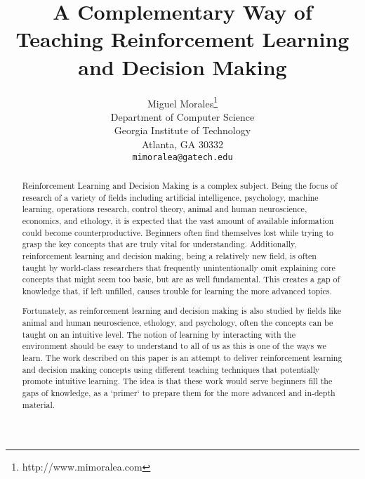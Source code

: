 \documentclass[11pt]{article} %
\title{A Complementary Way of Teaching Reinforcement Learning and Decision Making}
\author{
Miguel Morales\thanks{http://www.mimoralea.com} \\
Department of Computer Science \\
Georgia Institute of Technology \\
Atlanta, GA 30332 \\
\texttt{mimoralea@gatech.edu} \\
}
\begin{document}
\maketitle

\begin{abstract}
  Reinforcement Learning and Decision Making is a complex subject. Being the
  focus of research of a variety of fields including artificial intelligence,
  psychology, machine learning, operations research, control theory, animal
  and human neuroscience, economics, and ethology, it is expected that the
  vast amount of available information could become counterproductive.
  Beginners often find themselves lost while trying to grasp the key concepts
  that are truly vital for understanding. Additionally, reinforcement learning
  and decision making, being a relatively new field, is often taught by
  world-class researchers that frequently unintentionally omit explaining
  core concepts that might seem too basic, but are as well fundamental. This
  creates a gap of knowledge that, if left unfilled, causes trouble for learning
  the more advanced topics.

  Fortunately, as reinforcement learning and decision making is also studied
  by fields like animal and human neuroscience, ethology, and psychology, often
  the concepts can be taught on an intuitive level. The notion of learning
  by interacting with the environment should be easy to understand to all of
  us as this is one of the ways we learn. The work described on this paper
  is an attempt to deliver reinforcement learning and decision making concepts
  using different teaching techniques that potentially promote intuitive learning.
  The idea is that these work would serve beginners fill the gaps of knowledge,
  as a `primer` to prepare them for the more advanced and in-depth material.
\end{abstract}



\startmain %
\end{document}
